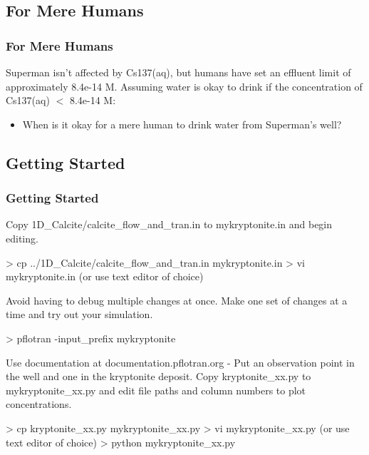\documentclass{beamer}
\newcommand\bluecomment[1]{{{\color{blue} #1}}}
\newcommand\greencomment[1]{{{\color{green} #1}}}
\begin{document}
\subsection{For Mere Humans}

\begin{frame}[fragile]\frametitle{For Mere Humans}
Superman isn't affected by \greencomment{Cs137(aq)}, but humans have set an effluent limit of approximately 8.4e-14 M. Assuming water is okay to drink if the concentration of \greencomment{Cs137(aq)} $<$ 8.4e-14 M:

\begin{itemize}
  \item When is it okay for a mere human to drink water from Superman's well?
\end{itemize}

\end{frame}

\subsection{Getting Started}

\begin{frame}[fragile]\frametitle{Getting Started}
Copy 1D\_Calcite/calcite\_flow\_and\_tran.in to mykryptonite.in and begin editing.
\begin{semiverbatim}
  > cp ../1D\_Calcite/calcite\_flow\_and\_tran.in mykryptonite.in
  > vi mykryptonite.in \bluecomment{(or use text editor of choice)}
\end{semiverbatim}
Avoid having to debug multiple changes at once. Make one set of changes at a time and try out your simulation.
\begin{semiverbatim}
  > pflotran -input\_prefix mykryptonite
\end{semiverbatim}
Use documentation at \bluecomment{documentation.pflotran.org}
-
Put an observation point in the well and one in the kryptonite deposit. Copy kryptonite\_xx.py to mykryptonite\_xx.py and edit file paths and column numbers to plot concentrations.
\begin{semiverbatim}
  > cp kryptonite\_xx.py mykryptonite\_xx.py
  > vi mykryptonite\_xx.py \bluecomment{(or use text editor of choice)}
  > python mykryptonite\_xx.py
\end{semiverbatim}

\end{frame}
\end{document}
